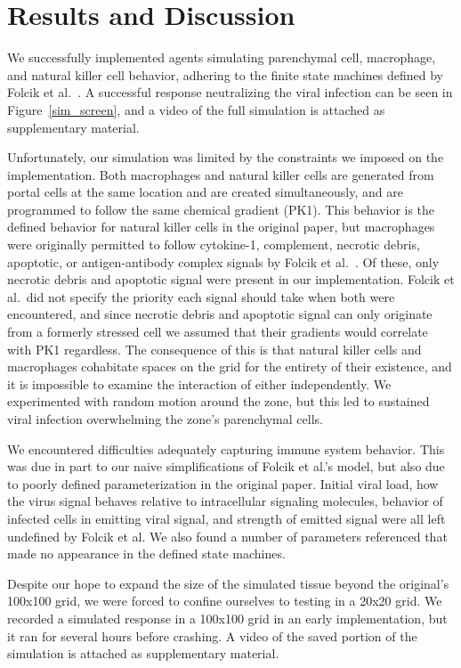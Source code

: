 \documentclass[10pt,conference]{IEEEtran}
\begin{document}
\section{Results and Discussion}
\noindent
We successfully implemented agents simulating parenchymal cell, macrophage, and
natural killer cell behavior, adhering to the finite state machines defined by
Folcik et al.~\cite{Folcik:2007}. A successful response neutralizing the viral
infection can be seen in Figure~\ref{sim_screen}, and a video of the full
simulation is attached as supplementary material. 

Unfortunately, our simulation was limited by the constraints we imposed on the
implementation. Both macrophages and natural killer cells are generated from
portal cells at the same location and are created simultaneously, and are
programmed to follow the same chemical gradient (PK1). This behavior is the
defined behavior for natural killer cells in the original paper, but
macrophages were originally permitted to follow cytokine-1, complement,
necrotic debris, apoptotic, or antigen-antibody complex signals by Folcik et
al.~\cite{Folcik:2007}. Of these, only necrotic debris and apoptotic signal
were present in our implementation. Folcik et al.\ did not specify the priority
each signal should take when both were encountered, and since necrotic debris
and apoptotic signal can only originate from a formerly stressed cell we
assumed that their gradients would correlate with PK1 regardless. The
consequence of this is that natural killer cells and macrophages cohabitate
spaces on the grid for the entirety of their existence, and it is impossible to
examine the interaction of either independently. We experimented with random
motion around the zone, but this led to sustained viral infection overwhelming
the zone's parenchymal cells. 

We encountered difficulties adequately capturing immune system behavior. This
was due in part to our naive simplifications of Folcik et al.'s model, but also
due to poorly defined parameterization in the original paper. Initial viral
load, how the virus signal behaves relative to intracellular signaling
molecules, behavior of infected cells in emitting viral signal, and strength of
emitted signal were all left undefined by Folcik et al. We also found a number
of parameters referenced that made no appearance in the defined state machines. 

Despite our hope to expand the size of the simulated tissue beyond the
original's 100x100 grid, we were forced to confine ourselves to testing in a
20x20 grid. We recorded a simulated response in a 100x100 grid in an early
implementation, but it ran for several hours before crashing. A video of the
saved portion of the simulation is attached as supplementary material.
\end{document}

